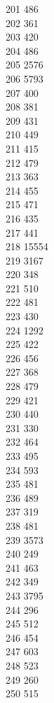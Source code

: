 { 201	486 \\
 202	361 \\
 203	420 \\
 204	486 \\
 205	2576 \\
 206	5793 \\
 207	400 \\
 208	381 \\
 209	431 \\
 210	449 \\
 211	415 \\
 212	479 \\
 213	363 \\
 214	455 \\
 215	471 \\
 216	435 \\
 217	441 \\
 218	15554 \\
 219	3167 \\
 220	348 \\
 221	510 \\
 222	481 \\
 223	430 \\
 224	1292 \\
 225	422 \\
 226	456 \\
 227	368 \\
 228	479 \\
 229	421 \\
 230	440 \\
 231	330 \\
 232	464 \\
 233	495 \\
 234	593 \\
 235	481 \\
 236	489 \\
 237	319 \\
 238	481 \\
 239	3573 \\
 240	249 \\
 241	463 \\
 242	349 \\
 243	3795 \\
 244	296 \\
 245	512 \\
 246	454 \\
 247	603 \\
 248	523 \\
 249	260 \\
 250	515 \\
}

